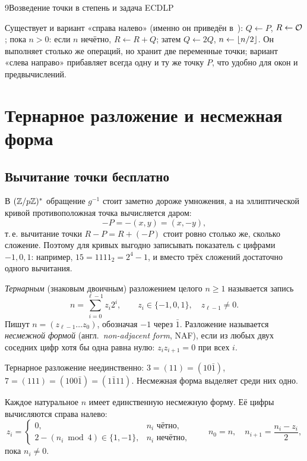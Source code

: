 \begin{lecture}{9}{Возведение точки в степень и задача ECDLP}

\begin{remark}
Существует и вариант «справа налево» (именно он приведён в~\cite[разд.~6.3.1]{hps}):
$Q \gets P$, $R \gets \mathcal{O}$; пока $n > 0$: если $n$ нечётно, $R \gets R + Q$; затем
$Q \gets 2Q$, $n \gets \lfloor n/2\rfloor$. Он выполняет столько же операций, но хранит две
переменные точки; вариант «слева направо» прибавляет всегда одну и ту же точку $P$, что удобно
для окон и предвычислений.
\end{remark}


\section{Тернарное разложение и несмежная форма}\label{l9:naf}

\subsection{Вычитание точки бесплатно}

В $(\mathbb{Z}/p\mathbb{Z})^{*}$ обращение $g^{-1}$ стоит заметно дороже умножения, а на эллиптической кривой
противоположная точка вычисляется даром:
\[
  -P = -(x, y) = (x, -y),
\]
т.\,е. вычитание точки $R - P = R + (-P)$ стоит ровно столько же, сколько сложение. Поэтому
для кривых выгодно записывать показатель с цифрами $-1, 0, 1$: например,
$15 = 1111_2 = 2^4 - 1$, и вместо трёх сложений достаточно одного вычитания.

\begin{definition}
\emph{Тернарным} (знаковым двоичным) разложением целого $n \ge 1$ называется запись
\[
  n = \sum_{i=0}^{\ell - 1} z_i 2^i, \qquad z_i \in \{-1, 0, 1\}, \quad z_{\ell-1} \ne 0.
\]
Пишут $n = (z_{\ell-1} \dots z_0)$, обозначая $-1$ через $\bar 1$. Разложение называется
\emph{несмежной формой} (англ.\ \emph{non-adjacent form}, NAF), если из любых двух соседних
цифр хотя бы одна равна нулю: $z_i z_{i+1} = 0$ при всех $i$.
\end{definition}

Тернарное разложение неединственно: $3 = (11) = (10\bar 1)$, $7 = (111) = (100\bar 1) =
(1\bar 1 11)$. Несмежная форма выделяет среди них одно.

\begin{theorem}\label{l9:naf-exists}
Каждое натуральное $n$ имеет единственную несмежную форму. Её цифры вычисляются справа налево:
\[
  z_i = \begin{cases} 0, & n_i \text{ чётно},\\ 2 - (n_i \bmod 4) \in \{1, -1\}, & n_i
  \text{ нечётно},\end{cases} \qquad n_0 = n, \quad n_{i+1} = \frac{n_i - z_i}{2},
\]
пока $n_i \ne 0$.
\end{theorem}


\end{lecture}
